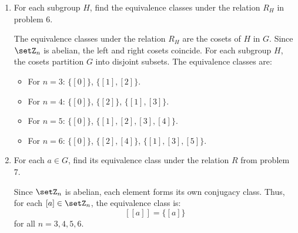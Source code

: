 \begin{enumerate}
\begin{enumerate}
    \item For each subgroup $H$, find the equivalence classes under the relation $R_H$ in problem 6.
    \begin{subanswer}
      The equivalence classes under the relation $R_H$ are the cosets of $H$ in $G$.
      Since $\setZ_n$ is abelian, the left and right cosets coincide.
      For each subgroup $H$, the cosets partition $G$ into disjoint subsets.
      The equivalence classes are:
      \begin{itemize}
        \item For $n=3$: $\{[0]\}$, $\{[1], [2]\}$.
        \item For $n=4$: $\{[0]\}$, $\{[2]\}$, $\{[1], [3]\}$.
        \item For $n=5$: $\{[0]\}$, $\{[1], [2], [3], [4]\}$.
        \item For $n=6$: $\{[0]\}$, $\{[2], [4]\}$, $\{[1], [3], [5]\}$.
      \end{itemize}
    \end{subanswer}
    \item For each $a \in G$, find its equivalence class under the relation $R$ from problem 7.
    \begin{subanswer}
      Since $\setZ_n$ is abelian, each element forms its own conjugacy class.
      Thus, for each $[a] \in \setZ_n$, the equivalence class is:
      \[
        [ [a] ] = \{ [a] \}
      \]
      for all $n=3,4,5,6$.
    \end{subanswer}
  \end{enumerate}
\end{enumerate}























